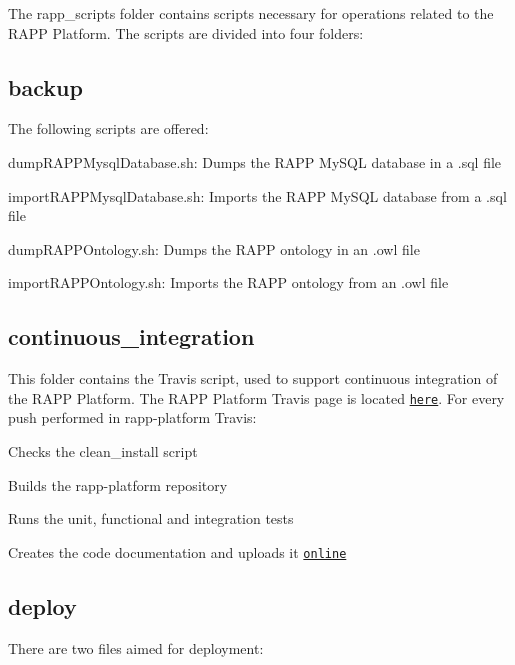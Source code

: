 The {\ttfamily rapp\-\_\-scripts} folder contains scripts necessary for operations related to the R\-A\-P\-P Platform. The scripts are divided into four folders\-:

\subsection*{backup}

The following scripts are offered\-:
\begin{DoxyItemize}
\item {\ttfamily dump\-R\-A\-P\-P\-Mysql\-Database.\-sh}\-: Dumps the R\-A\-P\-P My\-S\-Q\-L database in a .sql file
\item {\ttfamily import\-R\-A\-P\-P\-Mysql\-Database.\-sh}\-: Imports the R\-A\-P\-P My\-S\-Q\-L database from a .sql file
\item {\ttfamily dump\-R\-A\-P\-P\-Ontology.\-sh}\-: Dumps the R\-A\-P\-P ontology in an .owl file
\item {\ttfamily import\-R\-A\-P\-P\-Ontology.\-sh}\-: Imports the R\-A\-P\-P ontology from an .owl file
\end{DoxyItemize}

\subsection*{continuous\-\_\-integration}

This folder contains the Travis script, used to support continuous integration of the R\-A\-P\-P Platform. The R\-A\-P\-P Platform Travis page is located \href{https://travis-ci.org/rapp-project/rapp-platform}{\tt here}. For every push performed in rapp-\/platform Travis\-:
\begin{DoxyItemize}
\item Checks the clean\-\_\-install script
\item Builds the rapp-\/platform repository
\item Runs the unit, functional and integration tests
\item Creates the code documentation and uploads it \href{http://rapp-project.github.io/rapp-platform/documentation.html}{\tt online}
\end{DoxyItemize}

\subsection*{deploy}

There are two files aimed for deployment\-:



